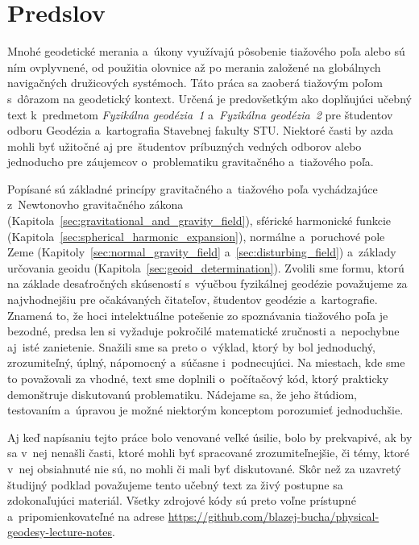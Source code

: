 \documentclass[a4paper,12pt]{book}
\begin{document}

\chapter*{Predslov}

Mnohé geodetické merania a~úkony využívajú pôsobenie tiažového poľa alebo sú 
ním ovplyvnené, od použitia olovnice až po merania založené na globálnych 
navigačných družicových systémoch.  Táto práca sa zaoberá tiažovým poľom 
s~dôrazom na geodetický kontext.  Určená je predovšetkým ako doplňujúci učebný 
text k~predmetom \emph{Fyzikálna geodézia~1} a~\emph{Fyzikálna geodézia~2} pre 
študentov odboru Geodézia a~kartografia Stavebnej fakulty STU.  Niektoré časti 
by azda mohli byť užitočné aj pre~študentov príbuzných vedných odborov alebo 
jednoducho pre záujemcov o~problematiku gravitačného a~tiažového poľa.

Popísané sú základné princípy gravitačného a~tiažového poľa vychádzajúce
z~Newtonovho gravitačného zákona
(Kapitola~\ref{sec:gravitational_and_gravity_field}), sférické harmonické
funkcie (Kapitola~\ref{sec:spherical_harmonic_expansion}), normálne a~poruchové
pole Zeme (Kapitoly~\ref{sec:normal_gravity_field}
a~\ref{sec:disturbing_field}) a~základy určovania geoidu
(Kapitola~\ref{sec:geoid_determination}).  Zvolili sme formu, ktorú na základe
desaťročných skúseností s~výučbou fyzikálnej geodézie považujeme za
najvhodnejšiu pre očakávaných čitateľov, študentov geodézie a~kartografie.
Znamená to, že hoci intelektuálne potešenie zo spoznávania tiažového poľa je
bezodné, predsa len si vyžaduje pokročilé matematické zručnosti a~nepochybne
aj~isté zanietenie.  Snažili sme sa preto o~výklad, ktorý by bol jednoduchý,
zrozumiteľný, úplný, nápomocný a~súčasne i~podnecujúci.  Na miestach, kde sme
to považovali za vhodné, text sme doplnili o~počítačový kód, ktorý prakticky
demonštruje diskutovanú problematiku.  Nádejame sa, že jeho štúdiom,
testovaním a~úpravou je možné niektorým konceptom porozumieť jednoduchšie.

Aj keď napísaniu tejto práce bolo venované veľké úsilie, bolo by prekvapivé, ak 
by sa v~nej nenašli časti, ktoré mohli byť spracované zrozumiteľnejšie, či 
témy, ktoré v~nej obsiahnuté nie sú, no mohli či mali byť diskutované.  Skôr 
než za uzavretý študijný podklad považujeme tento učebný text za živý postupne 
sa zdokonaľujúci materiál.  Všetky zdrojové kódy sú preto voľne prístupné 
a~pripomienkovateľné na adrese 
\url{https://github.com/blazej-bucha/physical-geodesy-lecture-notes}.
\end{document}
